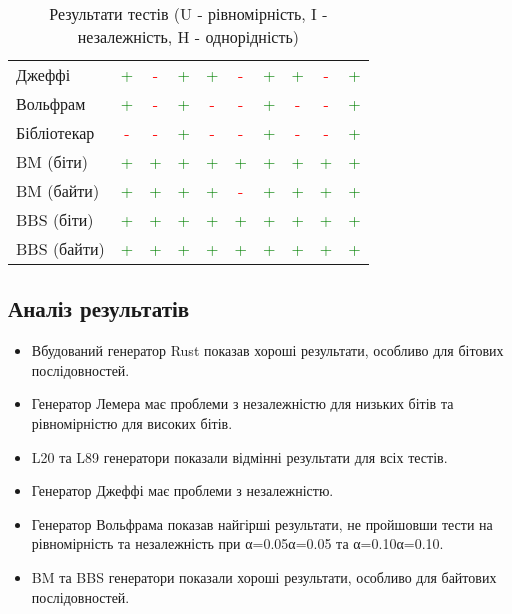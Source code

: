 \documentclass[12pt]{article}
\begin{document}
\begin{table}[htbp]
\begin{tabular}{l*{9}{c}}
Джеффі             & \textcolor{green}{+} & \textcolor{red}{-} & \textcolor{green}{+} & \textcolor{green}{+} & \textcolor{red}{-} & \textcolor{green}{+} & \textcolor{green}{+} & \textcolor{red}{-} & \textcolor{green}{+} \\
Вольфрам           & \textcolor{green}{+} & \textcolor{red}{-} & \textcolor{green}{+} & \textcolor{red}{-} & \textcolor{red}{-} & \textcolor{green}{+} & \textcolor{red}{-} & \textcolor{red}{-} & \textcolor{green}{+} \\
Бібліотекар         & \textcolor{red}{-} & \textcolor{red}{-} & \textcolor{green}{+} & \textcolor{red}{-} & \textcolor{red}{-} & \textcolor{green}{+} & \textcolor{red}{-} & \textcolor{red}{-} & \textcolor{green}{+} \\
BM (біти)          & \textcolor{green}{+} & \textcolor{green}{+} & \textcolor{green}{+} & \textcolor{green}{+} & \textcolor{green}{+} & \textcolor{green}{+} & \textcolor{green}{+} & \textcolor{green}{+} & \textcolor{green}{+} \\
BM (байти)         & \textcolor{green}{+} & \textcolor{green}{+} & \textcolor{green}{+} & \textcolor{green}{+} & \textcolor{red}{-} & \textcolor{green}{+} & \textcolor{green}{+} & \textcolor{green}{+} & \textcolor{green}{+} \\
BBS (біти)         & \textcolor{green}{+} & \textcolor{green}{+} & \textcolor{green}{+} & \textcolor{green}{+} & \textcolor{green}{+} & \textcolor{green}{+} & \textcolor{green}{+} & \textcolor{green}{+} & \textcolor{green}{+} \\
BBS (байти)        & \textcolor{green}{+} & \textcolor{green}{+} & \textcolor{green}{+} & \textcolor{green}{+} & \textcolor{green}{+} & \textcolor{green}{+} & \textcolor{green}{+} & \textcolor{green}{+} & \textcolor{green}{+} \\
\bottomrule
\end{tabular}
\caption{Результати тестів (U - рівномірність, I - незалежність, H - однорідність)}
\label{tab:results}
\end{table}

\subsection{Аналіз результатів}
\begin{itemize}
\item Вбудований генератор Rust показав хороші результати, особливо для бітових послідовностей.
\item Генератор Лемера має проблеми з незалежністю для низьких бітів та рівномірністю для високих бітів.
\item L20 та L89 генератори показали відмінні результати для всіх тестів.
\item Генератор Джеффі має проблеми з незалежністю.
\item Генератор Вольфрама показав найгірші результати, не пройшовши тести на рівномірність та незалежність при α=0.05α=0.05 та α=0.10α=0.10.
\item BM та BBS генератори показали хороші результати, особливо для байтових послідовностей.
\end{itemize}
\end{document}
